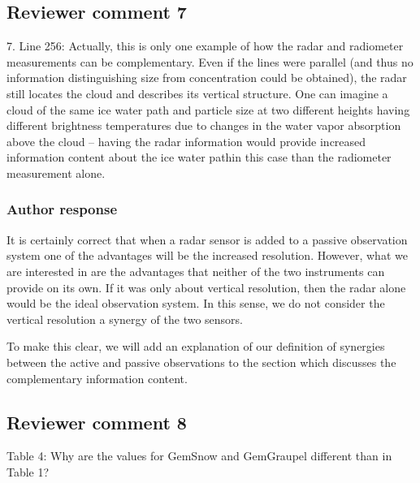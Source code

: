\documentclass[11pt]{scrartcl}
\begin{document}
\subsection*{Reviewer comment 7}

7. Line 256: Actually, this is only one example of how the radar and radiometer
measurements can be complementary. Even if the lines were parallel (and thus no
information distinguishing size from concentration could be obtained), the radar
still locates the cloud and describes its vertical structure. One can imagine a
cloud of the same ice water path and particle size at two different heights
having different brightness temperatures due to changes in the water vapor
absorption above the cloud – having the radar information would provide
increased information content about the ice water pathin this case than the
radiometer measurement alone.

\subsubsection*{Author response}

It is certainly correct that when a radar sensor is added to a passive
observation system one of the advantages will be the increased resolution.
However, what we are interested in are the advantages that neither of the two
instruments can provide on its own. If it was only about vertical resolution,
then the radar alone would be the ideal observation system. In this sense, we do
not consider the vertical resolution a synergy of the two sensors.

To make this clear, we will add an explanation of our definition of synergies
between the active and passive observations to the section which discusses the
complementary information content.




\subsection*{Reviewer comment 8}

Table 4: Why are the values for GemSnow and GemGraupel different than in Table 1?
\end{document}
